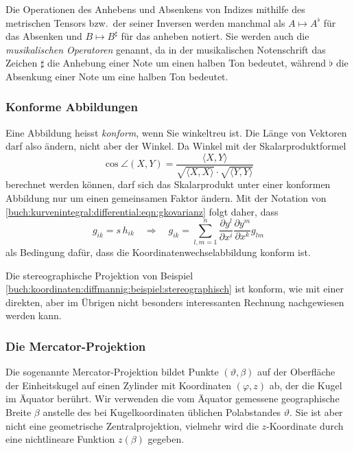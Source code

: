 Die Operationen des Anhebens und Absenkens von Indizes mithilfe
des metrischen Tensors bzw.~der seiner Inversen werden manchmal
als $A\mapsto A^\flat$ für das Absenken und $B\mapsto B^\sharp$
für das anheben notiert.
Sie werden auch die \emph{musikalischen Operatoren} genannt, da
%
in der musikalischen Notenschrift das Zeichen $\sharp$ die
%
Anhebung einer Note um einen halben Ton bedeutet, während
$\flat$ die Absenkung einer Note um eine halben Ton bedeutet.
\index{\flat@$\flat$}%

%
%
\subsubsection{Konforme Abbildungen}
Eine Abbildung heisst {\em konform}, wenn Sie winkeltreu ist.
Die Länge von Vektoren darf also ändern, nicht aber der Winkel.
Da Winkel mit der Skalarproduktformel
\[
\cos \angle(X,Y)
=
\frac{
\langle X,Y \rangle
}{
\!\sqrt{\langle X, X\rangle}\cdot\!\sqrt{\langle Y,Y\rangle}
}
\]
berechnet werden können, darf sich das Skalarprodukt unter einer
konformen Abbildung nur um einen gemeinsamen Faktor ändern.
Mit der Notation von
\eqref{buch:kurvenintegral:differential:eqn:gkovarianz}
folgt daher, dass
\[
g_{ik} = s\,h_{ik}
\quad\Rightarrow\quad
g_{ik}
=
\sum_{l,m=1}^n
\frac{\partial y^l}{\partial x^i}
\frac{\partial y^m}{\partial x^k}
g_{lm}
\]
als Bedingung dafür, dass die Koordinatenwechselabbildung
konform ist.

\begin{beispiel}
Die stereographische Projektion von Beispiel 
\ref{buch:koordinaten:diffmannig:beispiel:stereographisch}
ist konform, wie mit einer direkten, aber im Übrigen nicht
besonders interessanten Rechnung nachgewiesen werden kann.
\end{beispiel}

%
%
\subsubsection{Die Mercator-Projektion}
Die sogenannte Mercator-Projektion bildet Punkte $(\vartheta,\beta)$
%
auf der Oberfläche der Einheitskugel auf einen Zylinder mit Koordinaten
$(\varphi,z)$ ab, der die Kugel im Äquator berührt.
%
Wir verwenden die vom Äquator gemessene geographische Breite $\beta$
%
anstelle des bei Kugelkoordinaten üblichen Polabstandes $\vartheta$.
Sie ist aber nicht eine geometrische Zentralprojektion, vielmehr wird die
$z$-Koordinate durch eine nichtlineare Funktion $z(\beta)$
gegeben.

